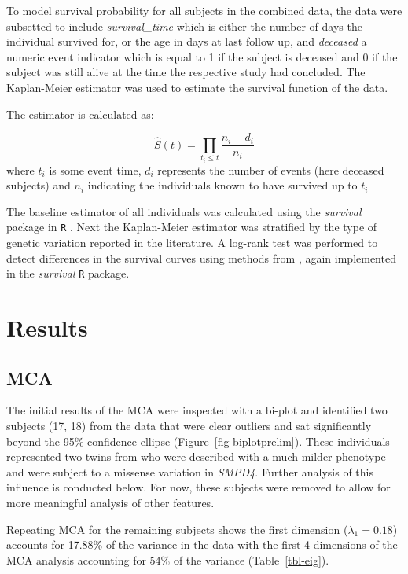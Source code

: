 \documentclass[
  authoryear,
  preprint,
  3p]{elsarticle}
\begin{document}
To model survival probability for all subjects in the combined data, the
data were subsetted to include \emph{survival\_time} which is either the
number of days the individual survived for, or the age in days at last
follow up, and \emph{deceased} a numeric event indicator which is equal
to 1 if the subject is deceased and 0 if the subject was still alive at
the time the respective study had concluded. The Kaplan-Meier estimator
\citep{kaplan1958nonparametric} was used to estimate the survival
function of the data.

The estimator is calculated as:

\[
\hat{S}(t) = \prod_{t_i \leq t}\frac{n_i - d_i}{n_i} 
\] where \(t_i\) is some event time, \(d_i\) represents the number of
events (here deceased subjects) and \(n_i\) indicating the individuals
known to have survived up to \(t_i\)

The baseline estimator of all individuals was calculated using the
\emph{survival} package in \texttt{R} \citep{survival-book}. Next the
Kaplan-Meier estimator was stratified by the type of genetic variation
reported in the literature. A log-rank test was performed to detect
differences in the survival curves using methods from
\citet{harrington1982class}, again implemented in the \emph{survival}
\texttt{R} package.

\hypertarget{results}{%
\section{Results}\label{results}}

\hypertarget{mca}{%
\subsection{MCA}\label{mca}}

The initial results of the MCA were inspected with a bi-plot and
identified two subjects (17, 18) from the data that were clear outliers
and sat significantly beyond the 95\% confidence ellipse
(Figure~\ref{fig-biplotprelim}). These individuals represented two twins
from \citet{magini2019loss} who were described with a much milder
phenotype and were subject to a missense variation in \emph{SMPD4}.
Further analysis of this influence is conducted below. For now, these
subjects were removed to allow for more meaningful analysis of other
features.

Repeating MCA for the remaining subjects shows the first dimension
(\(\lambda_1 = 0.18\)) accounts for 17.88\% of the variance in the data
with the first 4 dimensions of the MCA analysis accounting for 54\% of
the variance (Table~\ref{tbl-eig}).
\end{document}
